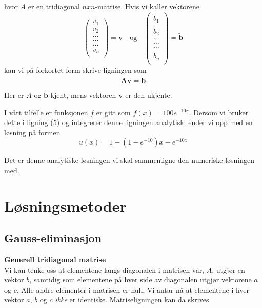\documentclass{article}
\begin{document}
hvor $A$ er en tridiagonal $nxn$-matrise. Hvis vi kaller vektorene
\begin{equation}
\left(\begin{array}{c}
                           v_1\\
                           v_2\\
                           \dots \\
                          \dots  \\
                          \dots \\
                           v_n\\
                      \end{array} \right) = \textbf{v} \quad \textrm{og} \quad 
                      \left(\begin{array}{c}
                           \tilde{b}_1\\
                           \tilde{b}_2\\
                           \dots \\
                           \dots \\
                          \dots \\
                           \tilde{b}_n\\
                      \end{array} \right) =\tilde{\textbf{b}}
\end{equation}
kan vi på forkortet form skrive ligningen som
\begin{equation}
\textbf{Av} = \tilde{\textbf{b}}
\end{equation}

Her er $A$ og $\tilde{\textbf{b}}$ kjent, mens vektoren $\textbf{v}$ er den ukjente.

I vårt tilfelle er funksjonen $f$ er gitt som $f(x) = 100e^{-10x}$. Dersom vi bruker dette i ligning (5) og integrerer denne ligningen analytisk, ender vi opp med en løsning på formen
\begin{equation}
u(x) = 1- (1-e^{-10})x-e^{-10x}
\end{equation}

Det er denne analytiske løsningen vi skal sammenligne den numeriske løsningen med. 

\section{Løsningsmetoder}
\subsection{Gauss-eliminasjon}
\textbf{Generell tridiagonal matrise}\\
Vi kan tenke oss at elementene langs diagonalen i matrisen vår, $A$, utgjør en vektor $b$, samtidig som elementene på hver side av diagonalen utgjør vektorene $a$ og $c$. Alle andre elementer i matrisen er null. Vi antar nå at elementene i hver vektor $a$, $b$ og $c$ \textit{ikke} er identiske. Matriseligningen kan da skrives
\end{document}
